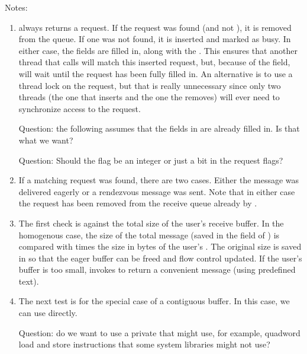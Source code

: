Notes:
\begin{enumerate}
\item {} always returns a request.  If the
  request was found (and not ), it is removed from the queue.  If
  one was not found, it is inserted and marked as busy.  In either case, 
  the  fields are filled in, along with the .
  This ensures that another thread that calls 
  will match this inserted request, but, because of the
   field,
  will wait until the request has been fully filled in.  An alternative is to
  use a thread lock on the request, but that is really unnecessary since only
  two threads (the one that inserts and the one the removes) will ever need to
  synchronize access to the request.

  Question: the following assumes that the fields in
   are already filled in.  Is that what we want?

  Question: Should the  flag be an integer or just a bit in the
  request flags?

\item If a matching request was found, there are two cases.  Either the
  message was delivered eagerly or a rendezvous message was sent. Note that
  in either case the request has been removed from the receive queue already 
  by .

\item The first check is against the total size of the user's receive buffer.
  In the homogenous case, the size of the total message (saved in the
   field of ) is
  compared with  times the size in bytes of the user's
  .  The original size is saved in  so that the
  eager buffer can be freed and flow control updated.
  If the user's buffer is too small, invokes 
  to return a convenient message (using predefined text).

\item The next test is for the special case of a contiguous buffer.  In this
  case, we can use  directly.

  Question: do we want to use a private  that might use, for 
  example, quadword load and store instructions that some system libraries
  might not use?


\end{enumerate}
